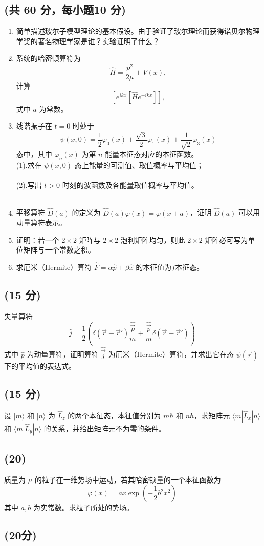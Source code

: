 
\subsection{(共 60 分，每小题10 分)}
\begin{enumerate}
\item 简单描述玻尔子模型理论的基本假设。由于验证了玻尔理论而获得诺贝尔物理学奖的著名物理学家是谁？实验证明了什么？

\item 系统的哈密顿算符为 
$$\hat{H} = \frac{p^2}{2\mu} + V(x),~$$
计算
$$\left[e^{ikx}[\hat{H}e^{-ikx}]\right],~$$
式中 $a$ 为常数。

\item 线谐振子在 $t = 0$ 时处于
$$ \psi(x, 0) = \frac{1}{2}\varphi_0(x) + \frac{\sqrt{3}}{2}\varphi_1(x) + \frac{1}{\sqrt{2}}\varphi_3(x)~ $$
态中，其中 $\varphi_n(x)$ 为第 $n$ 能量本征态对应的本征函数。\\
(1).求在 $\psi(x, 0)$ 态上能量的可测值、取值概率与平均值；\\\\
(2).写出 $t > 0$ 时刻的波函数及各能量取值概率与平均值。\\\\
\item 平移算符 $\hat{D}(a)$ 的定义为 $\hat{D}(a)\varphi(x) = \varphi(x + a)$，证明 $\hat{D}(a)$ 可以用动量算符表示。

\item 证明：若一个 $2 \times 2$ 矩阵与 $2 \times 2$ 泡利矩阵均匀，则此 $2 \times 2$ 矩阵必可写为单位矩阵与一个常数之积。

\item 求厄米（Hermite）算符 $\hat{F} = \alpha\hat{p} + \beta\hat{x}$ 的本征值为$f$本征态。
\end{enumerate}
\subsection{(15 分)}
失量算符
\[
\hat{j} = \frac{1}{2} \left( \delta(\vec{r} - \vec{r}') \frac{\hat{\vec{p}}}{m} + \frac{\hat{\vec{p}}}{m} \delta(\vec{r} - \vec{r}') \right)~
\]
式中 $\hat{p}$ 为动量算符，证明算符 $\hat{\vec{j}}$ 为厄米（Hermite）算符，并求出它在态 $\psi(\vec{r})$ 下的平均值的表达式。

\subsection{(15 分)}
设 $|m\rangle$ 和 $|n\rangle$ 为 $\hat{L}_z$ 的两个本征态，本征值分别为 $m\hbar$ 和 $n\hbar$，求矩阵元 $\langle m| \hat{L}_x |n \rangle$ 和 $\langle m| \hat{L}_y |n \rangle$ 的关系，并给出矩阵元不为零的条件。
\subsection{(20)}
质量为 $\mu$ 的粒子在一维势场中运动，若其哈密顿量的一个本征函数为
\[
\varphi(x) = a x \exp \left( -\frac{1}{2}b^2 x^2 \right)~
\]
其中 $a, b$ 为实常数。求粒子所处的势场。
\subsection{(20分)}